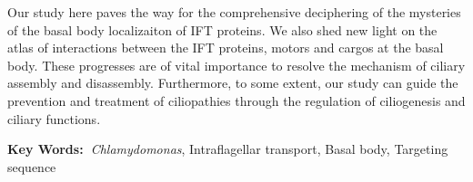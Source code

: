 Our study here paves the way for the comprehensive deciphering of the mysteries of the basal body localizaiton of IFT proteins. We also shed new light on the atlas of interactions between the IFT proteins, motors and cargos at the basal body. These progresses are of vital importance to resolve the mechanism of ciliary assembly and disassembly. Furthermore, to some extent, our study can guide the prevention and treatment of ciliopathies through the regulation of ciliogenesis and ciliary functions.

\vspace{10mm}

\noindent \textbf{Key Words:\ }\textit{Chlamydomonas}, Intraflagellar transport, Basal body, Targeting sequence
